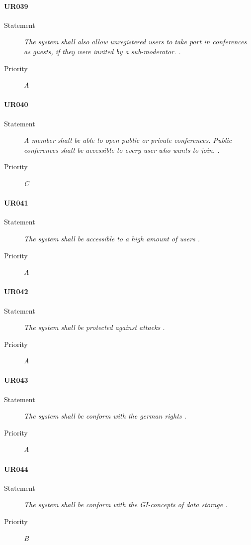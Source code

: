 \paragraph{UR039}
  \begin{description}
  \item [Statement] 
    \textit{ The system shall also allow unregistered \gls{user}s to take part in \gls{conference}s as \gls{guest}s,
            if they were invited by a \gls{sub-moderator}.
    .}
  \item [Priority] \textit{A}
\end{description}

\paragraph{UR040}
  \begin{description}
  \item [Statement] 
    \textit{ A \gls{member} shall be able to open public or private \gls{conference}s.
            Public \gls{conference}s shall be accessible to every \gls{user} who wants to join.
    .}
  \item [Priority] \textit{C}
\end{description}
    
\paragraph{UR041}
  \begin{description}
  \item [Statement] 
    \textit{ The system shall be accessible to a high amount of \gls{user}s
    .}
  \item [Priority] \textit{A}
\end{description}
    
\paragraph{UR042}
  \begin{description}
  \item [Statement] 
    \textit{ The system shall be protected against attacks
    .}
  \item [Priority] \textit{A}
\end{description}
    
\paragraph{UR043}
  \begin{description}
  \item [Statement] 
    \textit{ The system shall be conform with the german rights
    .}
  \item [Priority] \textit{A}
\end{description}
    
\paragraph{UR044}
  \begin{description}
  \item [Statement] 
    \textit{ The system shall be conform with the GI-concepts of data storage
    .}
  \item [Priority] \textit{B}
\end{description}
